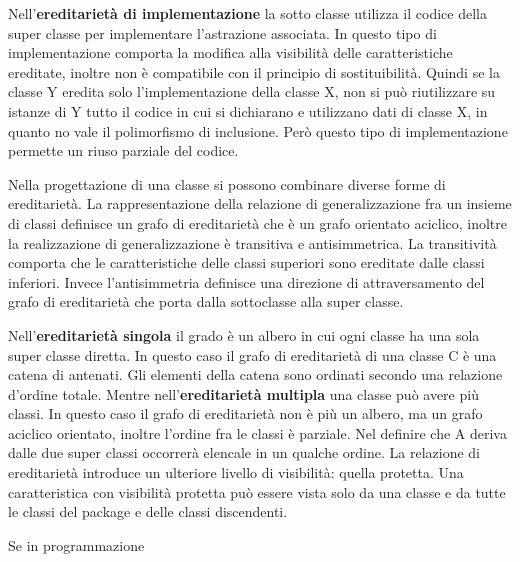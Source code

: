 \documentclass[a4paper,18pt]{extarticle}
\begin{document}
Nell'\textbf{ereditarietà di implementazione} la sotto classe utilizza il codice della super classe per implementare l'astrazione associata. In questo tipo di implementazione comporta la modifica alla visibilità delle caratteristiche ereditate, inoltre non è compatibile con il principio di sostituibilità. Quindi se la classe Y eredita solo l'implementazione della classe X, non si può riutilizzare su istanze di Y tutto il codice in cui si dichiarano e utilizzano dati di classe X, in quanto no vale il polimorfismo di inclusione. Però questo tipo di implementazione permette un riuso parziale del codice.

Nella progettazione di una classe si possono combinare diverse forme di ereditarietà. La rappresentazione della relazione di generalizzazione fra un insieme di classi definisce un grafo di ereditarietà che è un grafo orientato aciclico, inoltre la realizzazione di generalizzazione è transitiva e antisimmetrica. La transitività comporta che le caratteristiche delle classi superiori sono ereditate dalle classi inferiori. Invece l'antisimmetria definisce una direzione di attraversamento del grafo di ereditarietà che porta dalla sottoclasse alla super classe.

Nell'\textbf{ereditarietà singola} il grado è un albero in cui ogni classe ha una sola super classe diretta. In questo caso il grafo di ereditarietà di una classe C è una catena di antenati. Gli elementi della catena sono ordinati secondo una relazione d'ordine totale. Mentre nell'\textbf{ereditarietà multipla} una classe può avere più classi. In questo caso il grafo di ereditarietà non è più un albero, ma un grafo aciclico orientato, inoltre l'ordine fra le classi è parziale. Nel definire che A deriva dalle due super classi occorrerà elencale in un qualche ordine. La relazione di ereditarietà introduce un ulteriore livello di visibilità: quella protetta. Una caratteristica con visibilità protetta può essere vista solo da una classe e da tutte le classi del package e delle classi discendenti.

Se in programmazione
\end{document}
